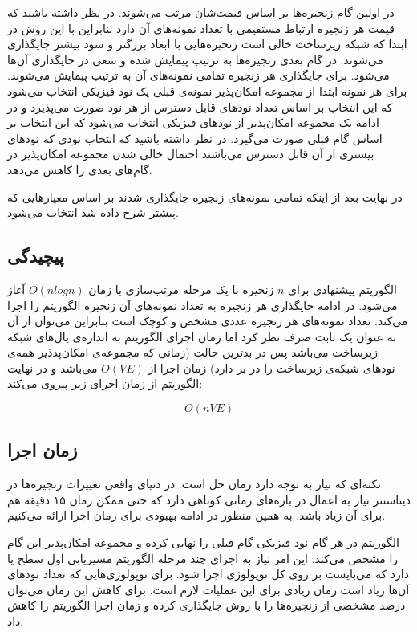 در اولین گام زنجیره‌ها بر اساس قیمت‌شان مرتب می‌شوند.
در نظر داشته باشید که قیمت هر زنجیره ارتباط مستقیمی با تعداد نمونه‌های آن دارد
بنابراین با این روش در ابتدا که شبکه زیرساخت خالی است زنجیره‌هایی با ابعاد بزرگتر و سود بیشتر جایگذاری می‌شوند.
در گام بعدی زنجیره‌ها به ترتیب پیمایش  شده و سعی در جایگذاری آن‌ها می‌شود.
برای جایگذاری هر زنجیره تمامی نمونه‌های آن به ترتیب پیمایش می‌شوند.
برای هر نمونه ابتدا از مجموعه امکان‌پذیر نمونه‌ی قبلی یک نود فیزیکی انتخاب می‌شود که این انتخاب بر اساس تعداد نودهای قابل دسترس از هر نود صورت می‌پذیرد و
در ادامه یک مجموعه امکان‌پذیر از نودهای فیزیکی انتخاب می‌شود که این انتخاب بر اساس گام قبلی صورت می‌گیرد.
در نظر داشته باشید که انتخاب نودی که نودهای بیشتری از آن قابل دسترس می‌باشند احتمال خالی شدن مجموعه امکان‌پذیر در گام‌های بعدی را کاهش می‌دهد.

در نهایت بعد از اینکه تمامی نمونه‌های زنجیره جایگذاری شدند  بر اساس معیارهایی که پیشتر شرح داده شد انتخاب می‌شود.

\subsection{پیچیدگی}

الگوریتم پیشنهادی برای \(n\) زنجیره با یک مرحله مرتب‌سازی با زمان \(O(nlogn)\) آغاز می‌شود.
در ادامه جایگذاری هر زنجیره به تعداد نمونه‌های آن زنجیره الگوریتم  را اجرا می‌کند.
تعداد نمونه‌های هر زنجیره عددی مشخص و کوچک است بنابراین می‌توان از آن به عنوان یک ثابت صرف نظر کرد
اما زمان اجرای الگوریتم  به اندازه‌ی یال‌های شبکه زیرساخت می‌باشد
پس در بدترین حالت (زمانی که مجموعه‌ی امکان‌پدذیر همه‌ی نودهای شبکه‌ی زیرساخت را در بر دارد)‌ زمان اجرا از
\(O(VE)\)
می‌باشد و در نهایت الگوریتم از زمان اجرای زیر پیروی می‌کند:

$$
O(nVE)
$$

\subsection{زمان اجرا}

نکته‌ای که نیاز به توجه دارد زمان حل است. در دنیای واقعی تغییرات زنجیره‌ها در دیتاسنتر نیاز به اعمال در بازه‌های زمانی کوتاهی دارد که
حتی ممکن زمان ۱۵ دقیقه هم برای آن زیاد باشد.
به همین منظور در ادامه بهبودی برای زمان اجرا ارائه می‌کنیم.

الگوریتم \cite{Bari2015} در هر گام نود فیزیکی گام قبلی را نهایی کرده و مجموعه امکان‌پذیر این گام را مشخص می‌کند.
این امر نیاز به اجرای چند مرحله الگوریتم مسیریابی اول سطح یا  دارد که
می‌بایست بر روی کل توپولوژی اجرا شود.
برای توپولوژی‌هایی که تعداد نودهای آن‌ها زیاد است زمان زیادی برای این عملیات لازم است.
برای کاهش این زمان می‌توان درصد مشخصی از زنجیره‌ها را با روش  جایگذاری کرده و زمان اجرا الگوریتم را کاهش داد.

